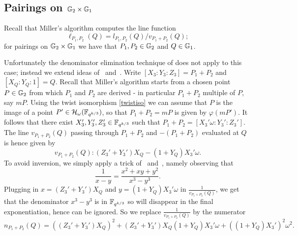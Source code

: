 \subsection{Pairings on $\mathbb{G}_{2} \times \mathbb{G}_{1}$}

Recall that Miller's algorithm computes the line function 
$$\ell_{P_1,P_2}(Q) = l_{P_1,P_2}(Q)/v_{P_1 + P_2}(Q);$$
for pairings on $\mathbb{G}_{2} \times \mathbb{G}_{1}$ we have that $P_1, P_2 \in \mathbb{G}_{2}$ and $Q \in \mathbb{G}_{1}$.

Unfortunately the denominator elimination technique of \cite{GGX10} does not apply to this case;
instead we extend ideas of~\cite{2008/lin} and~\cite{2009/deg15}.
Write $[X_3:Y_3:Z_3] = P_1 + P_2$ and $[X_Q:Y_Q:1] = Q$. 
Recall that Miller's algorithm starts from a chosen point $P \in \mathbb{G}_{2}$
from which $P_1$ and $P_2$ are derived - in particular $P_1 + P_2$
multiple of $P$, say $mP$.
Using the twist isomorphism \eqref{twistiso} we can assume that
$P$ is the image of a point $P' \in \mathcal{H}_{\omega}(\mathbb{F}_{q^{k/3}})$,
so that $P_1 + P_2 = mP$ is given by $\varphi(mP')$.
It follows that there exist $X_3', Y_3',Z_3' \in \mathbb{F}_{q^{k/3}}$ such that
$P_1 + P_2 = [X_3'\omega : Y_3':Z_3']$. 
The line $v_{P_1+P_2}(Q)$ passing through $P_1+P_2$ and $-(P_1 + P_2)$ 
evaluated at $Q$
is hence given by
\[v_{P_1+P_2}(Q): 
(Z_3' + Y_3')X_Q - (1+Y_Q)X_3'\omega.\]
To avoid inversion, we simply apply a trick of~\cite{2008/lin} and~\cite{2009/deg15}, 
namely observing that
\[\frac{1}{x-y} = \frac{x^2 + xy + y^2}{x^3-y^3}.\]
Plugging in $x = (Z_3' + Y_3')X_Q$ and $y = (1+Y_Q)X_3'\omega$ in $\frac{1}{v_{P_1+P_2}(Q)}$,
we get that the denominator $x^3 - y^3$ is in $\mathbb{F}_{q^{k/3}}$ so will disappear in the final exponentiation, hence can be ignored.
So we replace $\frac{1}{v_{P_1+P_2}(Q)}$ by the numerator 
$$n_{P_1+P_2}(Q) = ((Z_3' + Y_3')X_Q)^2 
+ (Z_3' + Y_3')X_Q(1+Y_Q)X_3'\omega 
+ ((1+Y_Q)X_3')^2\omega^2.$$

